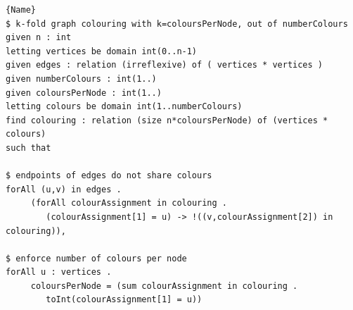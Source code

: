 \documentclass[anonymous,a4paper,UKenglish,cleveref,pdfa]{lipics-v2021}
\newcommand{\zap}[1]{}
\begin{document}
\zap{
\begin{itemize}
\end{itemize}
}

\begin{lstlisting}[caption={{\sc Essence} Specification of $k$-fold graph colouring, a variant in which each node in a given graph must be assigned $k$ colours with no pair of nodes connected by an edge sharing a colour.},label={lst:before},frame=tlrb]{Name}
$ k-fold graph colouring with k=coloursPerNode, out of numberColours
given n : int
letting vertices be domain int(0..n-1)
given edges : relation (irreflexive) of ( vertices * vertices )
given numberColours : int(1..)
given coloursPerNode : int(1..)
letting colours be domain int(1..numberColours)
find colouring : relation (size n*coloursPerNode) of (vertices * colours)
such that

$ endpoints of edges do not share colours
forAll (u,v) in edges .
     (forAll colourAssignment in colouring .
        (colourAssignment[1] = u) -> !((v,colourAssignment[2]) in colouring)),

$ enforce number of colours per node
forAll u : vertices .
     coloursPerNode = (sum colourAssignment in colouring .
        toInt(colourAssignment[1] = u))
        
\end{lstlisting}
\end{document}
